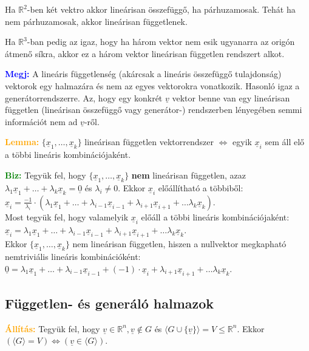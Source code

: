 \documentclass[../szamtud.tex]{subfiles}
\begin{document}
        Ha $\mathbb{R}^2$-ben két vektro akkor lineárisan összefüggő, ha párhuzamosak. Tehát ha nem párhuzamosak, akkor lineárisan függetlenek.

        Ha $\mathbb{R}^3$-ban pedig az igaz, hogy ha három vektor nem esik ugyanarra az origón átmenő síkra, akkor ez a három vektor lineárisan független rendszert alkot.

        \textcolor{blue}{\textbf{Megj:}} A lineáris függetlenség (akárcsak a lineáris összefüggő tulajdonság) vektorok egy halmazára és nem az egyes vektorokra vonatkozik. Hasonló igaz a generátorrendszerre. Az, hogy egy konkrét $\underline{v}$ vektor benne van egy lineárisan független (lineárisan összefüggő vagy generátor-) rendszerben lényegében semmi információt nem ad $\underline{v}$-ről.

        \textcolor{orange}{\textbf{Lemma:}} $\{\underline{x}_1, \dots, \underline{x}_k\}$ lineárisan független vektorrendszer $\Longleftrightarrow$ egyik $\underline{x}_i$ sem áll elő a többi lineáris kombinációjaként.

        \textcolor{green}{\textbf{Biz:}} Tegyük fel, hogy $\{\underline{x}_1, \dots, \underline{x}_k\}$ \textbf{nem} lineárisan független, azaz $\lambda_1\underline{x}_1 + \dots + \lambda_k \underline{x}_k = \underline{0}$ és $\lambda_i \neq 0$. Ekkor $\underline{x}_i$ előállítható a többiből: $\underline{x}_i = \frac{-1}{\lambda_i} \cdot (\lambda_1\underline{x}_1 + \dots + \lambda_{i-1}\underline{x}_{i-1} + \lambda_{i+1}\underline{x}_{i+1} + \dots \lambda_k \underline{x}_k)$. \\ Most tegyük fel, hogy valamelyik $\underline{x}_i$ előáll a többi lineáris kombinációjaként: $\underline{x}_i = \lambda_1\underline{x}_1 + \dots + \lambda_{i-1}\underline{x}_{i-1} + \lambda_{i+1}\underline{x}_{i+1} + \dots \lambda_k \underline{x}_k$. \\ Ekkor $\{\underline{x}_1, \dots, \underline{x}_k\}$ nem lineárisan független, hiszen a nullvektor megkapható nemtriviális lineáris kombinációként: $\underline{0} = \lambda_1\underline{x}_1 + \dots + \lambda_{i-1}\underline{x}_{i-1} + (-1) \cdot \underline{x}_i + \lambda_{i+1}\underline{x}_{i+1} + \dots \lambda_k \underline{x}_k$.

    \subsection{Független- és generáló halmazok}

        \textcolor{orange}{\textbf{Állítás:}} Tegyük fel, hogy $\underline{v} \in \mathbb{R}^n, \underline{v} \notin G$ és $\langle G \cup \{\underline{v}\} \rangle = V \leq \mathbb{R}^n$. Ekkor $(\langle G \rangle = V) \Longleftrightarrow (\underline{v} \in \langle G \rangle)$.
\end{document}
